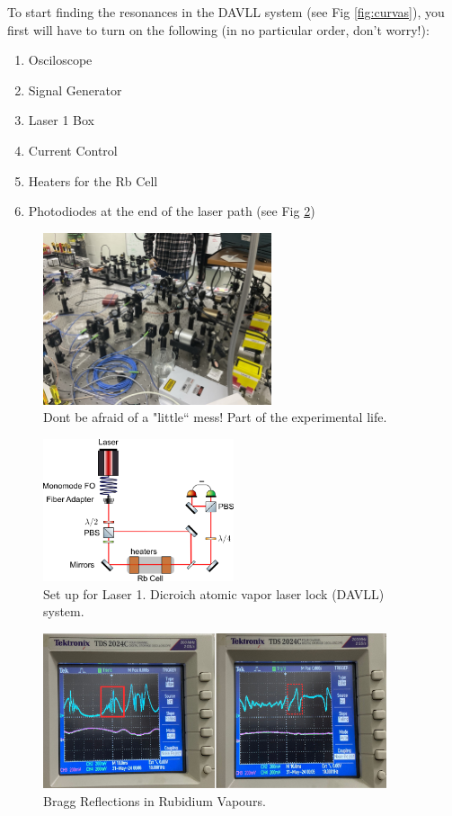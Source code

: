 \documentclass[10pt]{article}
\begin{document}
To start finding the resonances in the DAVLL system (see Fig \ref{fig:curvas}), you first will have to turn on the following (in no particular order, don't worry!):
\begin{enumerate}
    \item Osciloscope
    \item Signal Generator
    \item Laser 1 Box
    \item Current Control
    \item Heaters for the Rb Cell
    \item Photodiodes at the end of the laser path (see Fig \ref{fig:laser1})
\end{enumerate}

\begin{figure}
    \centering
    \includegraphics[width=0.6\textwidth]{img/Image (5).jpeg}
    \caption{Dont be afraid of a "little`` mess! Part of the experimental life.}
    \label{fig:normalorder}
\end{figure}


\begin{figure}[h]
    \centering
    \includegraphics[width=0.5\textwidth]{img/rect5909.png}
    \caption{Set up for Laser 1. Dicroich atomic vapor laser lock (DAVLL) system.}
    \label{fig:laser1}
\end{figure}

\begin{figure}[h]
    \centering
    \includegraphics[width=0.9\textwidth]{img/image1.png}
    \caption{Bragg Reflections in Rubidium Vapours.}
    \label{fig:braggref}
\end{figure}
\end{document}
